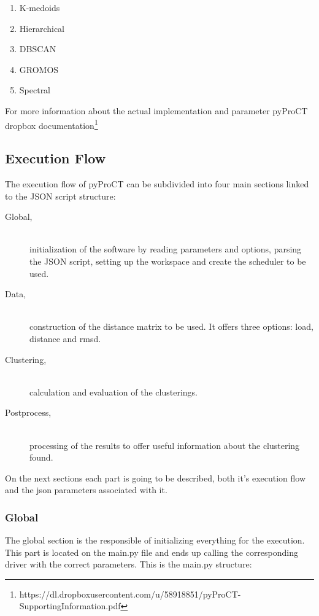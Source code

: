 \begin{enumerate}

\item{K-medoids}
\item{Hierarchical}
\item{DBSCAN}
\item{GROMOS}
\item{Spectral}

\end{enumerate}

For more information about the actual implementation and parameter pyProCT dropbox documentation\footnote{ https://dl.dropboxusercontent.com/u/58918851/pyProCT-SupportingInformation.pdf} 

\subsection{Execution Flow}
\label{sec:execution_flow}

The execution flow of pyProCT can be subdivided into four main sections linked to the JSON script structure:

\begin{description}
\item [Global,] \hfill \\ initialization of the software by reading parameters and options, parsing the JSON script, setting up the workspace and create the scheduler to be used.
\item [Data,] \hfill \\ construction of the distance matrix to be used. It offers three options: load, distance and rmsd.
\item [Clustering,] \hfill \\ calculation and evaluation of the clusterings.
\item [Postprocess,] \hfill \\ processing of the results to offer useful information about the clustering found.
\end{description}

On the next sections each part is going to be described, both it's execution flow and the json parameters associated with it.

\subsubsection{Global}

The global section is the responsible of initializing everything for the execution. This part is located on the main.py file and ends up calling the corresponding driver with the correct parameters. This is the main.py structure:

